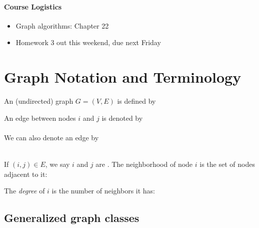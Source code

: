 \documentclass[11  pt]{exam}
\begin{document}
	
	
	\paragraph{Course Logistics}
	
	\begin{itemize}
		\item Graph algorithms: Chapter 22
		\item Homework 3 out this weekend, due next Friday
	\end{itemize}
	
	\section{Graph Notation and Terminology}
	
	An (undirected) graph $G = (V,E)$ is defined by  %
	\vspace{1.5cm}
	
	\noindent An edge between nodes $i$ and $j$ is denoted by \under{4cm}\\ \\
	
	We can also denote an edge by \under{4cm}\\ \\ 
	
	\vspace{8cm}
	
	\noindent If $(i,j) \in E$, we say $i$ and $j$ are \under{3cm}. The neighborhood of node $i$ is the set of nodes adjacent to it:
	
	\vspace{2cm}
	
	\noindent The \emph{degree} of $i$ is the number of neighbors it has: \under{2cm} %
	
	\vspace{1cm}
	
	\newpage 
	
	\subsection{Generalized graph classes}
	\vs{1cm}
	
\end{document}
